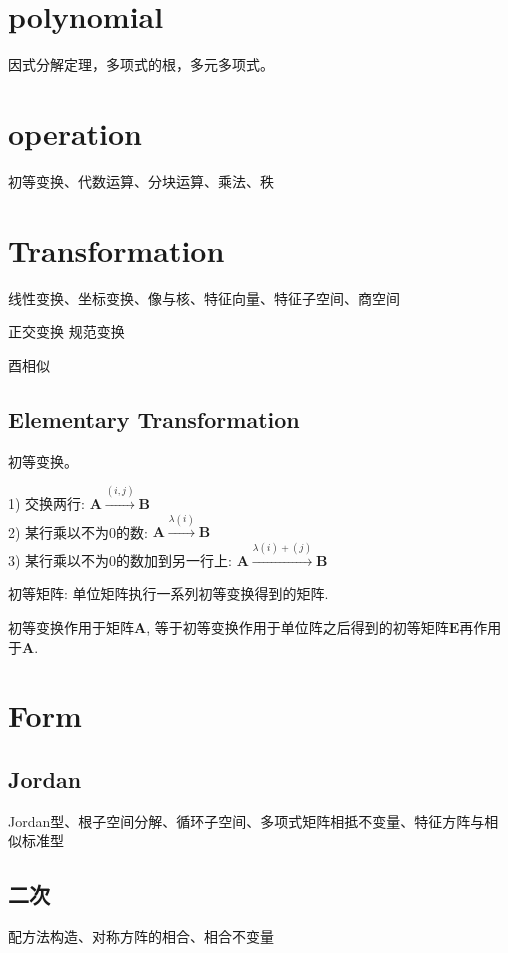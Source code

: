 \documentclass[UTF8]{../../09-Mathematics}
\begin{document}
\section{polynomial}
因式分解定理，多项式的根，多元多项式。


\section{operation}
初等变换、代数运算、分块运算、乘法、秩

\section{Transformation}

线性变换、坐标变换、像与核、特征向量、特征子空间、商空间

正交变换
规范变换

酉相似

\subsection{Elementary Transformation}
初等变换。

1) 交换两行: $ \boldsymbol A \xrightarrow {(i,j)} \boldsymbol B$ \\

2) 某行乘以不为0的数: $ \boldsymbol A \xrightarrow {\lambda(i)} \boldsymbol B$ \\

3) 某行乘以不为0的数加到另一行上: $ \boldsymbol A \xrightarrow {\lambda(i) + (j)} \boldsymbol B$

初等矩阵: 单位矩阵执行一系列初等变换得到的矩阵. 

初等变换作用于矩阵$\boldsymbol A$, 等于初等变换作用于单位阵之后得到的初等矩阵$\boldsymbol E$再作用于$\boldsymbol A$. 



\section{Form}

\subsection{Jordan}

Jordan型、根子空间分解、循环子空间、多项式矩阵相抵不变量、特征方阵与相似标准型

\subsection{二次}
配方法构造、对称方阵的相合、相合不变量
\end{document}
